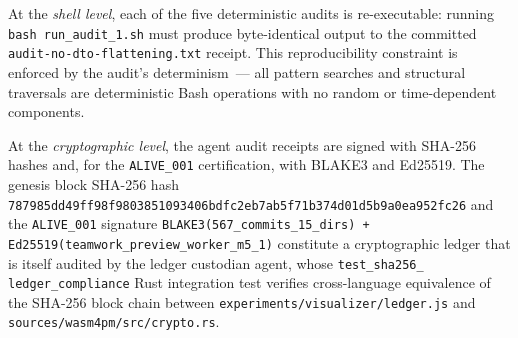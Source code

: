 At the \emph{shell level}, each of the five deterministic audits is
re-executable: running \texttt{bash run\_audit\_1.sh} must produce byte-identical
output to the committed \texttt{audit-no-dto-flattening.txt} receipt. This
reproducibility constraint is enforced by the audit's determinism~--- all pattern
searches and structural traversals are deterministic Bash operations with no
random or time-dependent components.

At the \emph{cryptographic level}, the agent audit receipts are signed with
SHA-256 hashes and, for the \texttt{ALIVE\_001} certification, with BLAKE3 and
Ed25519. The genesis block SHA-256 hash
\texttt{787985dd49ff98f9803851093406bdfc2eb7ab5f71b374d01d5b9a0ea952fc26} and the
\texttt{ALIVE\_001} signature \texttt{BLAKE3(567\_commits\_15\_dirs) +
Ed25519(teamwork\_preview\_worker\_m5\_1)} constitute a cryptographic ledger that
is itself audited by the ledger custodian agent, whose \texttt{test\_sha256\_
ledger\_compliance} Rust integration test verifies cross-language equivalence of
the SHA-256 block chain between \texttt{experiments/visualizer/ledger.js} and
\texttt{sources/wasm4pm/src/crypto.rs}.
